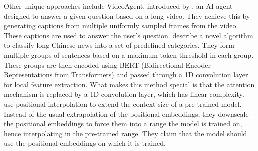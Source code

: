 	Other unique approaches include VideoAgent, introduced by \citet{wang2024videoagent}, an AI agent
	designed to answer a given question based on a long video.
	They achieve this by generating captions from multiple uniformly sampled frames from the video.
	These captions are used to answer the user's question.
	\citet{chen2022long} describe a novel algorithm to classify long Chinese news into a set of
	predefined categories.
	They form multiple groups of sentences based on a maximum token threshold in each group.
	These groups are then encoded using BERT (Bidirectional Encoder Representations from Transformers)
	and passed through a 1D convolution layer for local feature extraction.
	What makes this method special is that the attention mechanism is replaced by a 1D convolution layer,
	which has linear complexity.
	\citet{chen2023extending} use positional interpolation to extend the context size of a pre-trained
	model.
	Instead of the usual extrapolation of the positional embeddings, they downscale the positional
	embeddings to force them into a range the model is trained on, hence interpolating in the pre-trained
	range.
	They claim that the model should use the positional embeddings on which it is trained.
